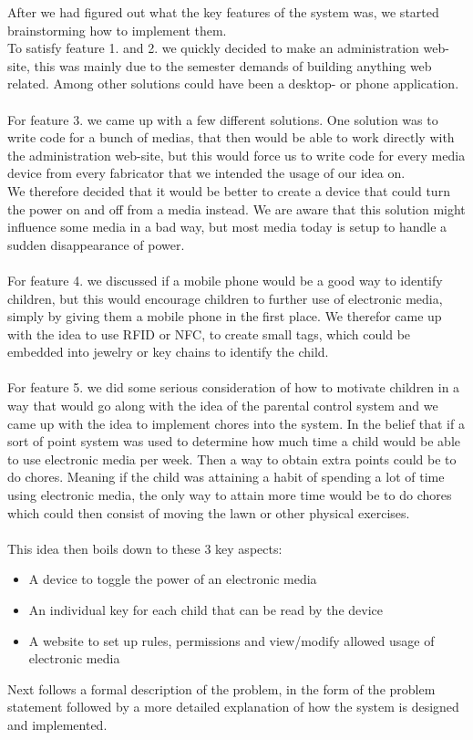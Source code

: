 After we had figured out what the key features of the system was, we started brainstorming how to implement them.\\
To satisfy feature 1. and 2. we quickly decided to make an administration web-site, this was mainly due to the semester demands of building anything web related. Among other solutions could have been a desktop- or phone application.\\
\\
For feature 3. we came up with a few different solutions. One solution was to write code for a bunch of medias, that then would be able to work directly with the administration web-site, but this would force us to write code for every media device from every fabricator that we intended the usage of our idea on.\\
We therefore decided that it would be better to create a device that could turn the power on and off from a media instead. We are aware that this solution might influence some media in a bad way, but most media today is setup to handle a sudden disappearance of power.\\
\\
For feature 4. we discussed if a mobile phone would be a good way to identify children, but this would encourage children to further use of electronic media, simply by giving them a mobile phone in the first place. We therefor came up with the idea to use RFID or NFC, to create small tags, which could be embedded into jewelry or key chains to identify the child.\\
\\
For feature 5. we did some serious consideration of how to motivate children in a way that would go along with the idea of the parental control system and we came up with the idea to implement chores into the system. In the belief that if a sort of point system was used to determine how much time a child would be able to use electronic media per week. Then a way to obtain extra points could be to do chores. Meaning if the child was attaining a habit of spending a lot of time using electronic media, the only way to attain more time would be to do chores which could then consist of moving the lawn or other physical exercises.\\
\\
This idea then boils down to these 3 key aspects:

\begin{itemize}
	\item A device to toggle the power of an electronic media
	\item An individual key for each child that can be read by the device
	\item A website to set up rules, permissions and view/modify allowed usage of electronic media
\end{itemize} 

Next follows a formal description of the problem, in the form of the problem statement followed by a more detailed explanation of how the system is designed and implemented.
